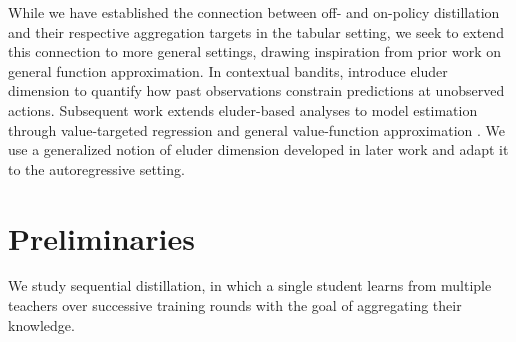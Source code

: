 \documentclass[11pt]{article}
\begin{document}
While we have established the connection between off- and on-policy distillation and their respective aggregation targets in the tabular setting, we seek to extend this connection to more general settings, drawing inspiration from prior work on general function approximation. In contextual bandits, \citet{russo2013eluder} introduce eluder dimension to quantify how past observations constrain predictions at unobserved actions. Subsequent work extends eluder-based analyses to model estimation through value-targeted regression \citep{ayoub2020model} and general value-function approximation \citep{wang2020reinforcement}. We use a generalized notion of eluder dimension developed in later work \citep{agarwal2023vo,zhao2024nearly,di2024pessimistic} and adapt it to the autoregressive setting.
\section{Preliminaries}
We study sequential distillation, in which a single student learns from multiple teachers over successive training rounds with the goal of aggregating their knowledge.
\end{document}
